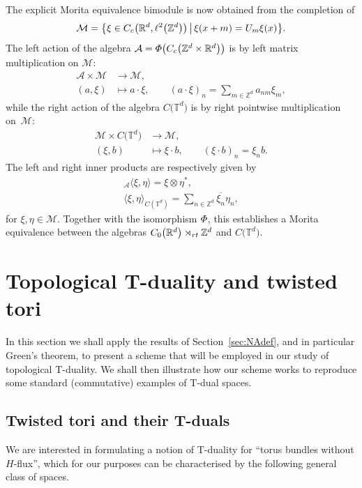 \documentclass[11pt]{article}
\numberwithin{equation}{section}
\numberwithin{equation}{section}
\newcommand{\Z}{\zed}
\newcommand{\rt}{{\rm rt}}
\newcommand{\zed}{{\mathbb Z}} %
\newcommand{\real}{{\mathbb R}} %
\newcommand{\torus}{{\mathbb T}} %
\def\alg{{\mathcal A}}
\def\Mcal{{\mathcal M}}
\begin{document}
\begin{Example}[tori]
The explicit Morita equivalence bimodule is now obtained from the
completion of
\[
\Mcal = \big\{\xi\in C_{\rm c}\big(\real^d,\ell^2\big(\Z^d\big)\big) \, \big| \, \xi(x+m) =
U_m \xi(x) \big\} .
\]
The left action of the algebra $\alg={\mit\Phi}\big(C_{\rm c}\big(\Z^d\times\real^d\big)\big)$ is by left
matrix multiplication on $\Mcal$:
\begin{align*}
\alg\times\Mcal &\longrightarrow\Mcal , \\
(a,\xi) & \longmapsto a\cdot\xi , \qquad (a\cdot\xi)_n=\sum_{m\in\Z^d}
a_{nm} \xi_m ,
\end{align*}
while the right action of the algebra $C\big(\torus^d\big)$ is by right pointwise
multiplication on~$\Mcal$:
\begin{align*}
\Mcal\times C\big(\torus^d\big) & \longrightarrow\Mcal , \nonumber \\
(\xi,b) & \longmapsto \xi\cdot b , \qquad (\xi\cdot b)_n=\xi_n b .
\end{align*}
The left and right inner
products are respectively given by
\begin{gather*}
{}_\alg\langle\xi,\eta\rangle = \xi\otimes\eta^* , \\
\langle\xi,\eta\rangle_{C(\torus^d)} = \sum_{n\in\zed^d}
\overline{\xi_n} \eta_n ,
\end{gather*}
for $\xi,\eta\in\Mcal$.
Together with the isomorphism $\mit\Phi$, this establishes a
Morita equivalence between the algebras $C_0\big(\real^d\big)\rtimes_\rt\zed^d$
and $C\big(\torus^d\big)$.
\end{Example}


\section{Topological T-duality and twisted tori}\label{sec:TopTtorus}

In this section we shall apply the results of Section~\ref{sec:NAdef}, and in particular
Green's theorem, to present a scheme
that will be employed in our study of topological T-duality. We shall
then illustrate how our scheme works to reproduce some standard
(commutative) examples of T-dual spaces.

\subsection{Twisted tori and their T-duals}\label{sec:twistedtori}

We are interested in formulating a notion of T-duality for
``torus bundles without $H$-flux'', which for our purposes can be
characterised by the following general class of spaces.
\end{document}
